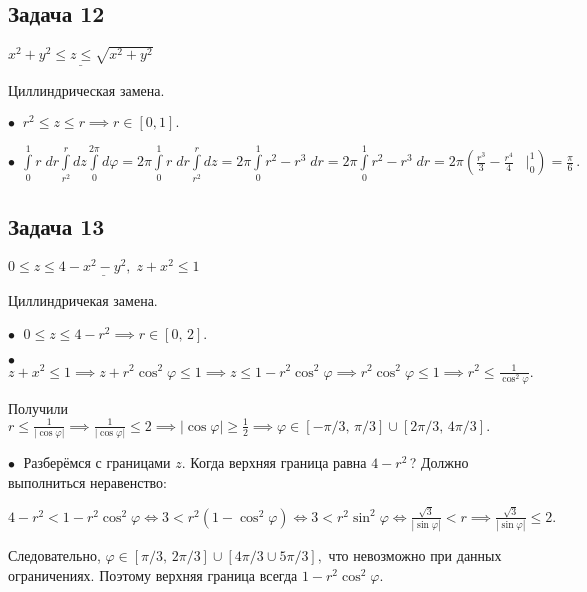 \documentclass[a4paper, fleqn]{article}
\begin{document}
    \subsection*{Задача 12}

    $\underline{x^2 + y^2 \leq z \leq \sqrt{x^2 + y^2}}$

    Циллиндрическая замена.

    $\bullet \; \; r^2 \leq z \leq r \implies r \in [0, 1].$

    $\bullet \; \, \int\limits_{0}^{1} r \; dr \int\limits_{r^2}^{r} dz \int\limits_{0}^{2 \pi} d \varphi =  2 \pi  \int\limits_{0}^{1} r \; dr \int\limits_{r^2}^{r} dz  =
      2 \pi  \int\limits_{0}^{1} r^2 - r^3 \; dr = 2 \pi  \int\limits_{0}^{1} r^2 - r^3 \; dr = 2 \pi \left( \frac{r^3}{3} - \frac{r^4}{4} \; \; \;
      \Bigg|_{0}^{1} \right) = \boxed{\frac{\pi}{6}} \, .$

    \subsection*{Задача 13} 
    
    $\underline{0 \leq z \leq 4 - x^2 - y^2, \; z + x^2 \leq 1}$
    
    Циллиндричекая замена.
    
    $\bullet \; $ $0 \leq z \leq 4 - r^2 \implies r \in [0, \, 2].$
    
    $\bullet \; $ $z + x^2 \leq 1 \implies z + r^2 \cos^2 \varphi \leq 1 \implies z \leq 1 - r^2 \cos^2 \varphi \implies r^2 \cos^2 \varphi \leq 1 \implies r^2 \leq \frac{1}{\cos^2 \varphi  }.$
    
    
    Получили $r \leq \frac{1}{|\cos \varphi|} \implies  \frac{1}{|\cos \varphi|} \leq 2\implies |\cos \varphi|\geq \frac{1}{2} \implies \varphi \in  [-\pi/3, \, \pi/3] \cup [2 \pi / 3, \, 4 \pi / 3].$
    
    
    $\bullet \;$ Разберёмся с границами $z$. Когда верхняя граница равна $4 - r^2 \, $? Должно выполниться неравенство:
    
    $4 - r^2 < 1 - r^2 \cos ^2 \varphi \iff 3 < r^2 (1 - \cos^2 \varphi) \iff 3 < r^2 \sin^2 \varphi \iff \frac{\sqrt{3}}{ |\sin \varphi| } < r \implies  \frac{\sqrt{3}}{ |\sin \varphi| } \leq 2.$
    
    \doublespacing Следовательно, $ \varphi \in [\pi/3, \, 2\pi/3] \cup [4 \pi / 3 \cup 5 \pi / 3],  $ что невозможно при данных ограничениях. Поэтому верхняя граница всегда $1 - r^2 \cos^2 \varphi.$
    
\end{document}
